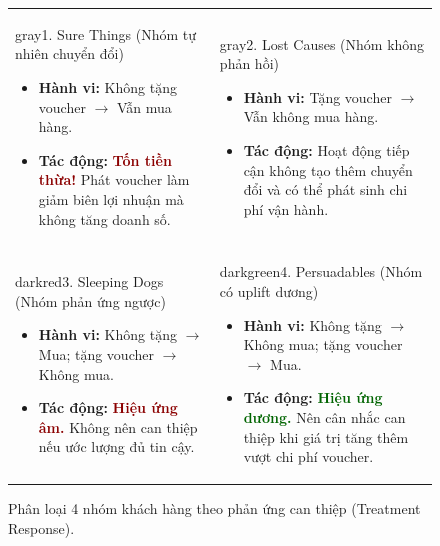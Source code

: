 \documentclass[11pt,a4paper]{article}
\begin{document}
\vspace{0.5em}
\begin{figure}[H]
\centering
\begin{tabularx}{\textwidth}{XX}
\begin{quadrantbox}{gray}{1. Sure Things (Nhóm tự nhiên chuyển đổi)}
\begin{itemize}
    \item \textbf{Hành vi:} Không tặng voucher $\rightarrow$ Vẫn mua hàng.
    \item \textbf{Tác động:} \textcolor{darkred}{\textbf{Tốn tiền thừa!}} Phát voucher làm giảm biên lợi nhuận mà không tăng doanh số.
\end{itemize}
\end{quadrantbox}
&
\begin{quadrantbox}{gray}{2. Lost Causes (Nhóm không phản hồi)}
\begin{itemize}
    \item \textbf{Hành vi:} Tặng voucher $\rightarrow$ Vẫn không mua hàng.
    \item \textbf{Tác động:} Hoạt động tiếp cận không tạo thêm chuyển đổi và có thể phát sinh chi phí vận hành.
\end{itemize}
\end{quadrantbox}
\\
\begin{quadrantbox}{darkred}{3. Sleeping Dogs (Nhóm phản ứng ngược)}
\begin{itemize}
    \item \textbf{Hành vi:} Không tặng $\rightarrow$ Mua; tặng voucher $\rightarrow$ Không mua.
    \item \textbf{Tác động:} \textcolor{darkred}{\textbf{Hiệu ứng âm.}} Không nên can thiệp nếu ước lượng đủ tin cậy.
\end{itemize}
\end{quadrantbox}
&
\begin{quadrantbox}{darkgreen}{4. Persuadables (Nhóm có uplift dương)}
\begin{itemize}
    \item \textbf{Hành vi:} Không tặng $\rightarrow$ Không mua; tặng voucher $\rightarrow$ Mua.
    \item \textbf{Tác động:} \textcolor{darkgreen}{\textbf{Hiệu ứng dương.}} Nên cân nhắc can thiệp khi giá trị tăng thêm vượt chi phí voucher.
\end{itemize}
\end{quadrantbox}
\end{tabularx}
\caption{Phân loại 4 nhóm khách hàng theo phản ứng can thiệp (Treatment Response).}
\end{figure}
\end{document}
